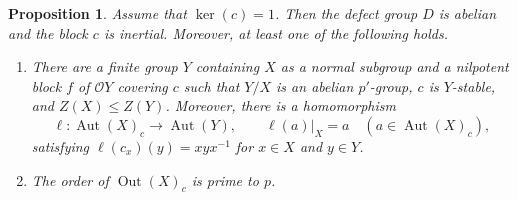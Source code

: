 \documentclass[11pt,a4paper]{article}
\newtheorem{proposition}[theorem]{Proposition}
\theoremstyle{definition}
\theoremstyle{remark}
\numberwithin{equation}{section}
\newcommand{\cO}{\mathcal{O}}
\DeclareMathOperator{\Aut}{Aut}
\DeclareMathOperator{\Out}{Out}
\begin{document}
	\begin{proposition}\label{prop:classification}
		Assume that $\ker(c)=1$. Then the defect group $D$ is abelian
		and the block $c$ is inertial.
		Moreover, at least one of the following holds.
		\begin{enumerate}
			\item[(i)] There are a finite group $Y$ containing $X$ as a normal
			subgroup and a nilpotent block $f$ of $\cO Y$ covering $c$ such that
			$Y/X$ is an abelian $p'$-group, $c$ is $Y$-stable, and
			$Z(X)\leq Z(Y)$. Moreover, there is a homomorphism
			\begin{equation}\label{eq:local-automorphism-lift}
				\ell:\Aut(X)_c\longrightarrow\Aut(Y),\qquad
				\ell(a)|_X=a\quad(a\in\Aut(X)_c),
			\end{equation}
			satisfying $\ell(c_x)(y)=xyx^{-1}$ for $x\in X$ and $y\in Y$.
			\item[(ii)] The order of $\Out(X)_c$ is prime to $p$.
		\end{enumerate}
	\end{proposition}
\end{document}
